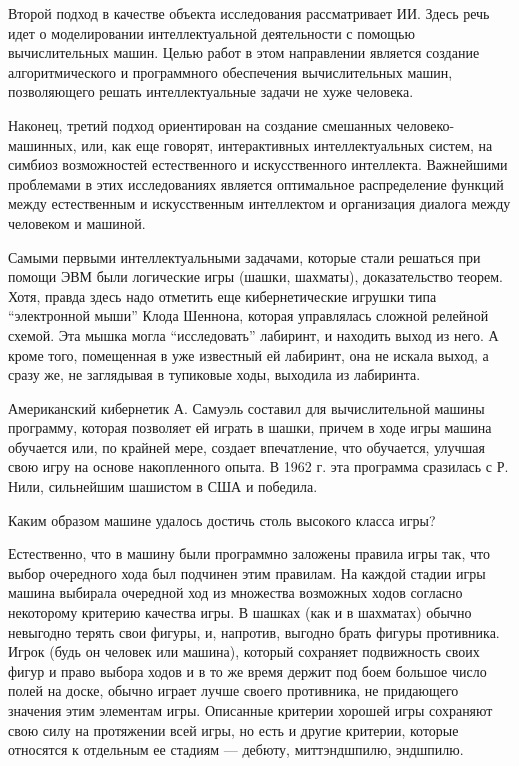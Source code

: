 Второй подход в качестве объекта исследования рассматривает ИИ. Здесь речь идет о моделировании интеллектуальной деятельности с помощью вычислительных машин. Целью работ в этом направлении является создание алгоритмического и программного обеспечения вычислительных машин, позволяющего решать интеллектуальные задачи не хуже человека.

Наконец, третий подход ориентирован на создание смешанных человеко-машинных, или, как еще говорят, интерактивных интеллектуальных систем, на симбиоз возможностей естественного и искусственного интеллекта. Важнейшими проблемами в этих исследованиях является оптимальное распределение функций между естественным и искусственным интеллектом и организация диалога между человеком и машиной.

Самыми первыми интеллектуальными задачами, которые стали решаться при помощи ЭВМ были логические игры (шашки, шахматы), доказательство теорем. Хотя, правда здесь надо отметить еще кибернетические игрушки типа ``электронной мыши'' Клода Шеннона, которая управлялась сложной релейной схемой. Эта мышка могла ``исследовать'' лабиринт, и находить выход из него. А кроме того, помещенная в уже известный ей лабиринт, она не искала выход, а сразу же, не заглядывая в тупиковые ходы, выходила из лабиринта.

Американский кибернетик А. Самуэль составил для вычислительной машины программу, которая позволяет ей играть в шашки, причем в ходе игры машина обучается или, по крайней мере, создает впечатление, что обучается, улучшая свою игру на основе накопленного опыта. В 1962 г. эта программа сразилась с Р. Нили, сильнейшим шашистом в США и победила.

Каким образом машине удалось достичь столь высокого класса игры?

Естественно, что в машину были программно заложены правила игры так, что выбор очередного хода был подчинен этим правилам. На каждой стадии игры машина выбирала очередной ход из множества возможных ходов согласно некоторому критерию качества игры. В шашках (как и в шахматах) обычно невыгодно терять свои фигуры, и, напротив, выгодно брать фигуры противника. Игрок (будь он человек или машина), который сохраняет подвижность своих фигур и право выбора ходов и в то же время держит под боем большое число полей на доске, обычно играет лучше своего противника, не придающего значения этим элементам игры. Описанные критерии хорошей игры сохраняют свою силу на протяжении всей игры, но есть и другие критерии, которые относятся к отдельным ее стадиям — дебюту, миттэндшпилю, эндшпилю.

